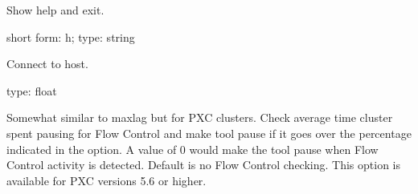 \documentclass[letterpaper,10pt,english]{sphinxmanual}
\begin{document}
\begin{fulllineitems}
\label{\detokenize{mariadb-schema-change:cmdoption-mariadb-schema-change-help}}
\sphinxAtStartPar
Show help and exit.

\end{fulllineitems}


\begin{fulllineitems}
\label{\detokenize{mariadb-schema-change:cmdoption-mariadb-schema-change-host}}
\sphinxAtStartPar
short form: \sphinxhyphen{}h; type: string

\sphinxAtStartPar
Connect to host.

\end{fulllineitems}


\begin{fulllineitems}
\label{\detokenize{mariadb-schema-change:cmdoption-mariadb-schema-change-max-flow-ctl}}
\sphinxAtStartPar
type: float

\sphinxAtStartPar
Somewhat similar to \textendash{}max\sphinxhyphen{}lag but for PXC clusters.
Check average time cluster spent pausing for Flow Control and make tool pause if
it goes over the percentage indicated in the option.
A value of 0 would make the tool pause when  Flow Control activity is
detected.
Default is no Flow Control checking.
This option is available for PXC versions 5.6 or higher.

\end{fulllineitems}
\end{document}
